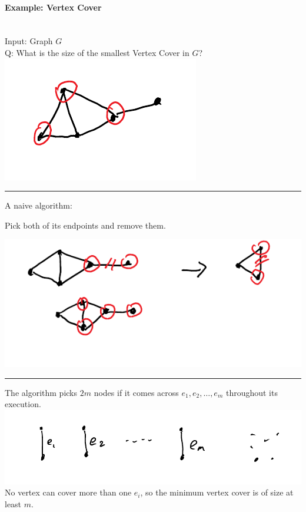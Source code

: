\documentclass[12 pt]{article}
\begin{document}
          \paragraph{Example: Vertex Cover}~
          \\ Input: Graph $G$
          \\ Q: What is the size of the smallest Vertex Cover in $G$?
          \\ \includegraphics[width=.45\textwidth]{i145.pdf}
          \\ \noindent \rule{\textwidth}{0.5pt}
          A naive algorithm:
          \begin{algorithmic}
            \State Pick both of its endpoints and remove them.
            \EndWhile
          \end{algorithmic}
          \includegraphics[width=.9\textwidth]{i146.pdf}
          \\ \noindent \rule{\textwidth}{0.5pt}
          The algorithm picks $2m$ nodes if it comes across $e_1, e_2,
          \ldots, e_m$ throughout its execution.
          \\ \includegraphics[width=.9\textwidth]{i147.pdf}
          \\No vertex can cover more than one $e_i$, so the minimum
          vertex cover is of size at least $m$.
\end{document}
